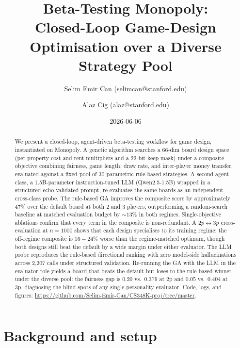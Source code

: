 \documentclass[10pt]{article}
\title{Beta-Testing Monopoly: \\Closed-Loop Game-Design Optimisation
       over a Diverse Strategy Pool}
\author{Selim Emir Can (selimcan@stanford.edu) \and Alaz Cig (alaz@stanford.edu)}
\date{2026-06-06}
\begin{document}
\maketitle

\begin{abstract}
We present a closed-loop, agent-driven beta-testing workflow for game
design, instantiated on Monopoly. A genetic algorithm searches a 66-dim
board design space (per-property cost and rent multipliers and a 22-bit
keep-mask) under a composite objective combining fairness, game length,
draw rate, and inter-player money transfer, evaluated against a fixed
pool of 30 parametric rule-based strategies. A second agent class, a
1.5B-parameter instruction-tuned LLM (Qwen2.5-1.5B) wrapped in a
structured echo-validated prompt, re-evaluates the same boards as an
independent cross-class probe. The rule-based GA improves the composite
score by approximately $47\%$ over the default board at both 2 and
3 players, outperforming a random-search baseline at matched
evaluation budget by $\sim 13\%$ in both regimes. Single-objective ablations confirm that every term in the
composite is non-redundant. A $2p\!\leftrightarrow\!3p$
cross-evaluation at $n{=}1000$ shows that each design specialises
to its training regime: the off-regime composite is $16\!-\!24\%$
worse than the regime-matched optimum, though both designs still
beat the default by a wide margin under either evaluator.
The LLM probe reproduces the rule-based directional ranking with zero
model-side hallucinations across 2{,}207 calls under structured
validation. Re-running the GA with the LLM in the evaluator role yields
a board that beats the default but loses to the rule-based winner under
the diverse pool: the fairness gap is $0.20$ vs.\ $0.379$ at 2p and
$0.05$ vs.\ $0.404$ at 3p, diagnosing the blind spots of any
single-personality evaluator. Code, logs, and figures:
\url{https://github.com/Selim-Emir-Can/CS348K-proj/tree/master}.
\end{abstract}

\section{Background and setup}\label{sec:bg}
\end{document}
